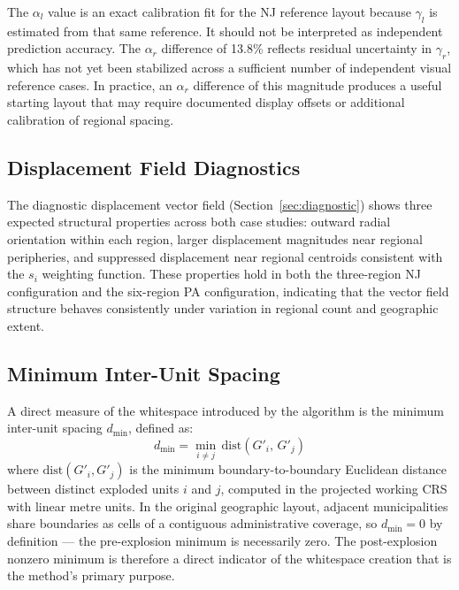 \documentclass[12pt, a4paper]{article}
\numberwithin{equation}{section}
\begin{document}
The $\alpha_l$ value is an exact calibration fit for the NJ reference layout because $\gamma_l$ is estimated from that same reference. It should not be interpreted as independent prediction accuracy. The $\alpha_r$ difference of 13.8\% reflects residual uncertainty in $\gamma_r$, which has not yet been stabilized across a sufficient number of independent visual reference cases. In practice, an $\alpha_r$ difference of this magnitude produces a useful starting layout that may require documented display offsets or additional calibration of regional spacing.

\subsection{Displacement Field Diagnostics}

The diagnostic displacement vector field (Section~\ref{sec:diagnostic}) shows three expected structural properties across both case studies: outward radial orientation within each region, larger displacement magnitudes near regional peripheries, and suppressed displacement near regional centroids consistent with the $s_i$ weighting function. These properties hold in both the three-region NJ configuration and the six-region PA configuration, indicating that the vector field structure behaves consistently under variation in regional count and geographic extent.

\subsection{Minimum Inter-Unit Spacing}

A direct measure of the whitespace introduced by the algorithm is the minimum inter-unit spacing $d_{\min}$, defined as:
\[
  d_{\min} = \min_{i \neq j}\, \mathrm{dist}(G'_i,\, G'_j)
\]
where $\mathrm{dist}(G'_i, G'_j)$ is the minimum boundary-to-boundary Euclidean distance between distinct exploded units $i$ and $j$, computed in the projected working CRS with linear metre units. In the original geographic layout, adjacent municipalities share boundaries as cells of a contiguous administrative coverage, so $d_{\min} = 0$ by definition --- the pre-explosion minimum is necessarily zero. The post-explosion nonzero minimum is therefore a direct indicator of the whitespace creation that is the method's primary purpose.
\end{document}
